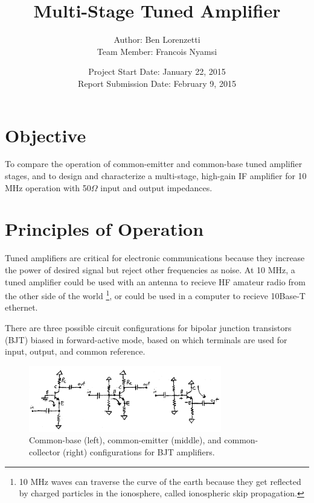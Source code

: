 \documentclass[titlepage, letterpaper, 10.5pt]{article}
\begin{document}
\title{Multi-Stage Tuned Amplifier}
\author{Author: Ben Lorenzetti\\
Team Member: Francois Nyamsi}
\date{Project Start Date: January 22, 2015\\
Report Submission Date: February 9, 2015}
\maketitle

\clearpage
\mbox{}
\thispagestyle{empty}
\clearpage
\setcounter{page}{1}

\tableofcontents

\section{Objective}

To compare the operation of common-emitter and common-base tuned
amplifier stages, and to design and characterize a multi-stage,
high-gain IF amplifier for 10 MHz operation with 50$\Omega$ input and
output impedances.

\clearpage
\section{Principles of Operation}

Tuned amplifiers are critical for electronic communications because
they increase the power of desired signal but reject other frequencies
as noise. At 10 MHz, a tuned amplifier could be used with an antenna
to recieve HF amateur radio from the other side of the world
\footnote{10 MHz waves can traverse the curve of the earth because
they get reflected by charged particles in the ionosphere, called
ionospheric skip propagation.},
or could be used in a computer to recieve 10Base-T ethernet.

There are three possible circuit configurations for bipolar junction
transistors (BJT) biased in forward-active mode, based on
which terminals are used for input, output, and common reference.

\begin{figure}[ht]
	\centering
	\includegraphics[width=0.75\textwidth]
		{figures/BJTforwardBiasConfigurations.png}
	\caption{
		Common-base (left), common-emitter (middle), and
		common-collector (right) configurations for BJT
		amplifiers.
	}
	\label{BJTforwardBiasConfigurations}
\end{figure}
\end{document}
